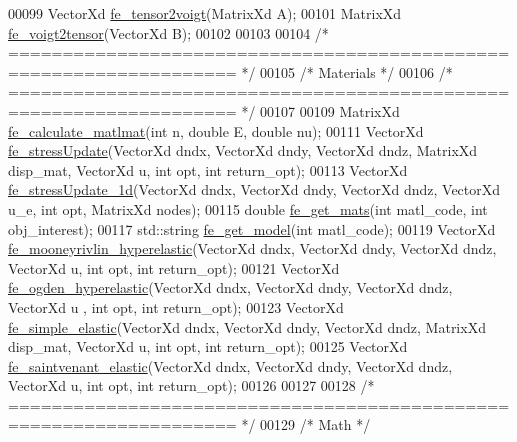 \begin{DoxyCode}
00099 VectorXd \hyperlink{functions_8h_a73c4523ec7068af2af9e8431021f5fdf}{fe\_tensor2voigt}(MatrixXd A);
00101 MatrixXd \hyperlink{functions_8h_a721a169d6a3d34b5584817ccd1c48cd7}{fe\_voigt2tensor}(VectorXd B);
00102 
00103 
00104 \textcolor{comment}{/* =================================================================== */}
00105 \textcolor{comment}{/* Materials */}
00106 \textcolor{comment}{/* =================================================================== */}
00107 
00109 MatrixXd \hyperlink{functions_8h_abbc5cafd6bb8048b69b3bd6f26ceb5f8}{fe\_calculate\_matlmat}(\textcolor{keywordtype}{int} n, \textcolor{keywordtype}{double} E, \textcolor{keywordtype}{double} nu);
00111 VectorXd \hyperlink{functions_8h_a7d0fd8cfef8b891901eb6f0f780fd9f2}{fe\_stressUpdate}(VectorXd dndx, VectorXd dndy, VectorXd dndz, MatrixXd disp\_mat, 
      VectorXd u, \textcolor{keywordtype}{int} opt, \textcolor{keywordtype}{int} return\_opt);
00113 VectorXd \hyperlink{functions_8h_a94c1b672863e28bc2c70d08726939929}{fe\_stressUpdate\_1d}(VectorXd dndx, VectorXd dndy, VectorXd dndz, VectorXd u\_e, \textcolor{keywordtype}{
      int} opt, MatrixXd nodes);
00115 \textcolor{keywordtype}{double} \hyperlink{functions_8h_af7ffbad6dfcc99fc88b130c1a7b1720a}{fe\_get\_mats}(\textcolor{keywordtype}{int} matl\_code, \textcolor{keywordtype}{int} obj\_interest);
00117 std::string \hyperlink{functions_8h_a34d6fb85943d945b7e8600d2ef4220d0}{fe\_get\_model}(\textcolor{keywordtype}{int} matl\_code);
00119 VectorXd \hyperlink{functions_8h_a66b469439c736421744f6aef9e05a485}{fe\_mooneyrivlin\_hyperelastic}(VectorXd dndx, VectorXd dndy, VectorXd 
      dndz, VectorXd u, \textcolor{keywordtype}{int} opt, \textcolor{keywordtype}{int} return\_opt);
00121 VectorXd \hyperlink{functions_8h_ab27ecb703db33cb21a8a6d2fbfbf125f}{fe\_ogden\_hyperelastic}(VectorXd dndx, VectorXd dndy, VectorXd dndz, VectorXd u
      , \textcolor{keywordtype}{int} opt, \textcolor{keywordtype}{int} return\_opt);
00123 VectorXd \hyperlink{functions_8h_ab0911abb05a0ca06eb4f330890ee0641}{fe\_simple\_elastic}(VectorXd dndx, VectorXd dndy, VectorXd dndz, MatrixXd disp\_mat,
       VectorXd u, \textcolor{keywordtype}{int} opt, \textcolor{keywordtype}{int} return\_opt);
00125 VectorXd \hyperlink{functions_8h_af2a970e883d0c4a7ad750547c07c5f24}{fe\_saintvenant\_elastic}(VectorXd dndx, VectorXd dndy, VectorXd dndz, VectorXd
       u, \textcolor{keywordtype}{int} opt, \textcolor{keywordtype}{int} return\_opt);
00126 
00127 
00128 \textcolor{comment}{/* =================================================================== */}
00129 \textcolor{comment}{/* Math */}

\end{DoxyCode}

